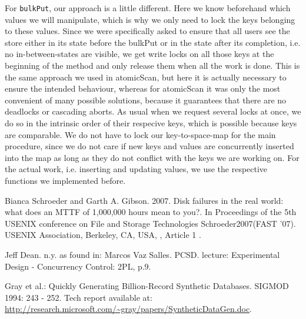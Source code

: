 \documentclass[12pt,a4paper]{article}
\begin{document}
For \texttt{bulkPut}, our approach is a little different. Here we know beforehand which values we will manipulate, which is why we only need to lock the keys belonging to these values. Since we were specifically asked to ensure that all users see the store either in its state before the bulkPut or in the state after its completion, i.e. no in-between-states are visible, we get write locks on all those keys at the beginning of the method and only release them when all the work is done. This is the same approach we used in atomicScan, but here it is actually necessary to ensure the intended behaviour, whereas for atomicScan it was only the most convenient of many possible solutions, because it guarantees that there are no deadlocks or cascading aborts. As usual when we request several locks at once, we do so in the intrinsic order of their respecive keys, which is possible because keys are comparable. We do not have to lock our key-to-space-map for the main procedure, since we do not care if new keys and values are concurrently inserted into the map as long as they do not conflict with the keys we are working on. For the actual work, i.e. inserting and updating values, we use the respective functions we implemented before.
 
\begin{thebibliography}{1}

 Bianca Schroeder and Garth A. Gibson. 2007. Disk failures in the real world: what does an MTTF of 1,000,000 hours mean to you?. In Proceedings of the 5th USENIX conference on File and Storage Technologies Schroeder2007(FAST '07). USENIX Association, Berkeley, CA, USA, , Article 1 .

 Jeff Dean. n.y. as found in: Marcos Vaz Salles. PCSD. lecture: Experimental Design - Concurrency Control: 2PL, p.9.

 Gray et al.: Quickly Generating Billion-Record Synthetic Databases. SIGMOD 1994: 243 - 252. Tech report available at: \url{http://research.microsoft.com/~gray/papers/SyntheticDataGen.doc}.

\end{thebibliography}
\end{document}
